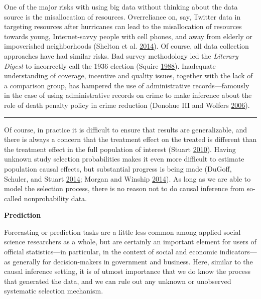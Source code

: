 \documentclass[]{krantz}
\begin{document}
One of the major risks with using big data without thinking about the
data source is the misallocation of resources. Overreliance on, say,
Twitter data in targeting resources after hurricanes can lead to the
misallocation of resources towards young, Internet-savvy people with
cell phones, and away from elderly or impoverished neighborhoods
(Shelton et al. \protect\hyperlink{ref-shelton2014mapping}{2014}). Of
course, all data collection approaches have had similar risks. Bad
survey methodology led the \emph{Literary Digest} to incorrectly call
the 1936 election (Squire \protect\hyperlink{ref-squire19881936}{1988}).
Inadequate understanding of coverage, incentive and quality issues,
together with the lack of a comparison group, has hampered the use of
administrative records---famously in the case of using administrative
records on crime to make inference about the role of death penalty
policy in crime reduction (Donohue III and Wolfers
\protect\hyperlink{ref-donohue2006uses}{2006}).

\begin{center}\rule{0.5\linewidth}{\linethickness}\end{center}

Of course, in practice it is difficult to ensure that results are
generalizable, and there is always a concern that the treatment effect
on the treated is different than the treatment effect in the full
population of interest (Stuart
\protect\hyperlink{ref-stuart2010matching}{2010}). Having unknown study
selection probabilities makes it even more difficult to estimate
population causal effects, but substantial progress is being made
(DuGoff, Schuler, and Stuart
\protect\hyperlink{ref-dugoff2014generalizing}{2014}; Morgan and Winship
\protect\hyperlink{ref-morgan2014counterfactuals}{2014}). As long as we
are able to model the selection process, there is no reason not to do
causal inference from so-called nonprobability data.

\textbf{Prediction}

Forecasting or prediction tasks are a little less common among applied
social science researchers as a whole, but are certainly an important
element for users of official statistics---in particular, in the context
of social and economic indicators---as generally for decision-makers in
government and business. Here, similar to the causal inference setting,
it is of utmost importance that we do know the process that generated
the data, and we can rule out any unknown or unobserved systematic
selection mechanism.
\end{document}
